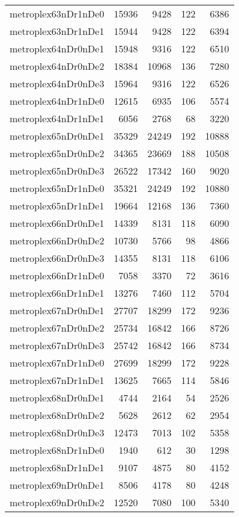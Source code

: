 \begin{longtable}{lrrrr}
metroplex63nDr1nDe0 & 15936 & 9428 & 122 & 6386 \\
metroplex63nDr1nDe1 & 15944 & 9428 & 122 & 6394 \\
metroplex64nDr0nDe1 & 15948 & 9316 & 122 & 6510 \\
metroplex64nDr0nDe2 & 18384 & 10968 & 136 & 7280 \\
metroplex64nDr0nDe3 & 15964 & 9316 & 122 & 6526 \\
metroplex64nDr1nDe0 & 12615 & 6935 & 106 & 5574 \\
metroplex64nDr1nDe1 & 6056 & 2768 & 68 & 3220 \\
metroplex65nDr0nDe1 & 35329 & 24249 & 192 & 10888 \\
metroplex65nDr0nDe2 & 34365 & 23669 & 188 & 10508 \\
metroplex65nDr0nDe3 & 26522 & 17342 & 160 & 9020 \\
metroplex65nDr1nDe0 & 35321 & 24249 & 192 & 10880 \\
metroplex65nDr1nDe1 & 19664 & 12168 & 136 & 7360 \\
metroplex66nDr0nDe1 & 14339 & 8131 & 118 & 6090 \\
metroplex66nDr0nDe2 & 10730 & 5766 & 98 & 4866 \\
metroplex66nDr0nDe3 & 14355 & 8131 & 118 & 6106 \\
metroplex66nDr1nDe0 & 7058 & 3370 & 72 & 3616 \\
metroplex66nDr1nDe1 & 13276 & 7460 & 112 & 5704 \\
metroplex67nDr0nDe1 & 27707 & 18299 & 172 & 9236 \\
metroplex67nDr0nDe2 & 25734 & 16842 & 166 & 8726 \\
metroplex67nDr0nDe3 & 25742 & 16842 & 166 & 8734 \\
metroplex67nDr1nDe0 & 27699 & 18299 & 172 & 9228 \\
metroplex67nDr1nDe1 & 13625 & 7665 & 114 & 5846 \\
metroplex68nDr0nDe1 & 4744 & 2164 & 54 & 2526 \\
metroplex68nDr0nDe2 & 5628 & 2612 & 62 & 2954 \\
metroplex68nDr0nDe3 & 12473 & 7013 & 102 & 5358 \\
metroplex68nDr1nDe0 & 1940 & 612 & 30 & 1298 \\
metroplex68nDr1nDe1 & 9107 & 4875 & 80 & 4152 \\
metroplex69nDr0nDe1 & 8506 & 4178 & 80 & 4248 \\
metroplex69nDr0nDe2 & 12520 & 7080 & 100 & 5340 \\

\end{longtable}
